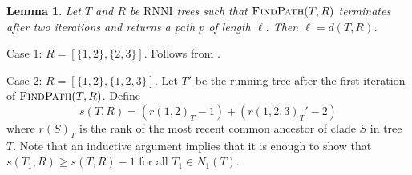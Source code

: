 \documentclass{amsart}
\newtheorem{lemma}{Lemma}
\newcommand{\rnni}{\mathrm{RNNI}}
\newcommand{\findpath}{\textsc{FindPath}}
\begin{document}
\begin{lemma}
Let $T$ and $R$ be $\rnni$ trees such that $\findpath(T, R)$ terminates after two iterations and returns a path $p$ of length $\ell$.
Then $\ell = d(T, R)$.
\end{lemma}

\proof
Case 1: $R = [\{1, 2\}, \{2, 3\}]$.
Follows from \autocite{Collienne2019-ca}.

Case 2: $R = [\{1, 2\}, \{1, 2, 3\}]$.
Let $T'$ be the running tree after the first iteration of $\findpath(T, R)$.
Define
\[
s(T, R) = (r(1, 2)_T - 1) + (r(1, 2, 3)_T' - 2)
\]
where $r(S)_T$ is the rank of the most recent common ancestor of clade $S$ in tree $T$.
Note that an inductive argument implies that it is enough to show that $s(T_1, R) \geq s(T, R) - 1$ for all $T_1 \in N_1(T)$.
\endproof
\end{document}
